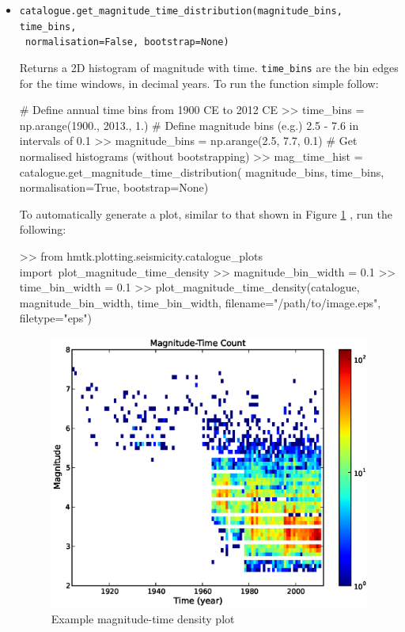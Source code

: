 \begin{itemize}
\item \verb;catalogue.get_magnitude_time_distribution(magnitude_bins, time_bins,;\\
\verb; normalisation=False, bootstrap=None);

Returns a 2D histogram of magnitude with time. \verb=time_bins= are the bin edges for the time windows, in decimal years. To run the function simple follow:

\begin{python}[frame=single]
# Define annual time bins from 1900 CE to 2012 CE
>> time_bins = np.arange(1900., 2013., 1.)
# Define magnitude bins (e.g.) 2.5 - 7.6 in intervals of 0.1
>> magnitude_bins = np.arange(2.5, 7.7, 0.1)
# Get normalised histograms (without bootstrapping)
>> mag_time_hist = catalogue.get_magnitude_time_distribution(
    magnitude_bins,
    time_bins,
    normalisation=True,
    bootstrap=None)
\end{python}

To automatically generate a plot, similar to that shown in Figure \ref{fig:mag_time_density} , run the following:

\begin{python}[frame=single]
>> from hmtk.plotting.seismicity.catalogue_plots import\
    plot_magnitude_time_density
>> magnitude_bin_width = 0.1
>> time_bin_width = 0.1 
>> plot_magnitude_time_density(catalogue,
                               magnitude_bin_width,
                               time_bin_width,
                               filename="/path/to/image.eps", 
                               filetype="eps")
\end{python}

\begin{figure}[htb]
  \centering
      \includegraphics[trim=10mm 8mm 10mm 10mm, clip, width=12cm]{./figures/magnitude_time_density.eps}
  \caption{Example magnitude-time density plot}
  \label{fig:mag_time_density}
\end{figure}
\end{itemize}


